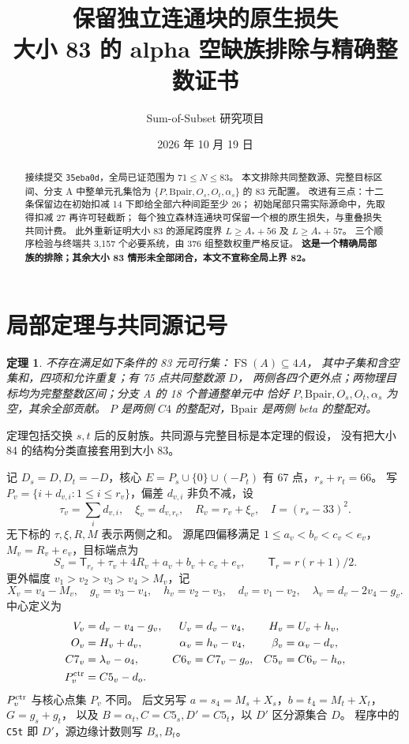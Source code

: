 \documentclass[11pt,a4paper]{article}
\title{保留独立连通块的原生损失\\\large 大小 83 的 alpha 空缺族排除与精确整数证书}
\author{Sum-of-Subset 研究项目}
\date{2026 年 10 月 19 日}
\newtheorem{theorem}{定理}[section]
\newcommand{\T}{\mathsf T}
\newcommand{\A}{A_*}
\begin{document}
\maketitle
\begin{abstract}
接续提交 \texttt{35eba0d}，全局已证范围为 $71\le N\le83$。
本文排除共同整数源、完整目标区间、分支 A 中整单元孔集恰为
$\{P,\mathrm{Bpair},O_s,O_t,\alpha_s\}$ 的 83 元配置。
改进有三点：十二条保留边在初始扣减 14 下即给全部六种间距至少 26；
初始尾部只需实际源命中，先取得扣减 27 再许可轻截断；
每个独立森林连通块可保留一个根的原生损失，与重叠损失共同计费。
此外重新证明大小 83 的源尾跨度界 $L\ge\A+56$ 及 $L\ge\A+57$。
三个顺序检验与终端共 3,157 个必要系统，由 376 组整数权重严格反证。
\textbf{这是一个精确局部族的排除；其余大小 83 情形未全部闭合，本文不宣称全局上界 82。}
\end{abstract}

\section{局部定理与共同源记号}
\begin{theorem}\label{thm:main}
不存在满足如下条件的 83 元可行集：$\operatorname{FS}(A)\subseteq4A$，
其中子集和含空集和，四项和允许重复；有 75 点共同整数源 $D$，
两侧各四个更外点；两物理目标均为完整整数区间；分支 A 的 18 个普通整单元中
恰好 $P,\mathrm{Bpair},O_s,O_t,\alpha_s$ 为空，其余全部贡献。
$P$ 是两侧 $C4$ 的整配对，$\mathrm{Bpair}$ 是两侧 beta 的整配对。
\end{theorem}
定理包括交换 $s,t$ 后的反射族。共同源与完整目标是本定理的假设，
没有把大小 84 的结构分类直接套用到大小 83。

记 $D_s=D,D_t=-D$，核心
$E=P_s\cup\{0\}\cup(-P_t)$ 有 67 点，$r_s+r_t=66$。
写 $P_v=\{i+d_{v,i}:1\le i\le r_v\}$，偏差 $d_{v,i}$ 非负不减，设
\[
 \tau_v=\sum_i d_{v,i},\quad\xi_v=d_{v,r_v},\quad R_v=r_v+\xi_v,
 \quad I=(r_s-33)^2.
\]
无下标的 $\tau,\xi,R,M$ 表示两侧之和。
源尾四偏移满足 $1\le a_v<b_v<c_v<e_v$，$M_v=R_v+e_v$，目标端点为
\[
 S_v=\T_{r_v}+\tau_v+4R_v+a_v+b_v+c_v+e_v,
 \qquad \T_r=r(r+1)/2.
\]
更外幅度 $v_1>v_2>v_3>v_4>M_v$，记
\[
 X_v=v_4-M_v,\quad g_v=v_3-v_4,\quad h_v=v_2-v_3,
 \quad d_v=v_1-v_2,\quad\lambda_v=d_v-2v_4-g_v.
\]
中心定义为
\begin{align*}
 V_v&=d_v-v_4-g_v,&U_v&=d_v-v_4,&H_v&=U_v+h_v,\\
 O_v&=H_v+d_v,&\alpha_v&=h_v-v_4,&\beta_v&=\alpha_v-d_v,\\
 C7_v&=\lambda_v-o_4,&C6_v&=C7_v-g_o,&C5_v&=C6_v-h_o,\\
 P_v^{\rm ctr}&=C5_v-d_o.&&&&
\end{align*}
$P_v^{\rm ctr}$ 与核心点集 $P_v$ 不同。
后文另写 $a=s_4=M_s+X_s$，$b=t_4=M_t+X_t$，$G=g_s+g_t$，
以及 $B=\alpha_t,C=C5_s,D'=C5_t$，以 $D'$ 区分源集合 $D$。
程序中的 \texttt{C5t} 即 $D'$，源边缘计数则写 $B_s,B_t$。
\end{document}
